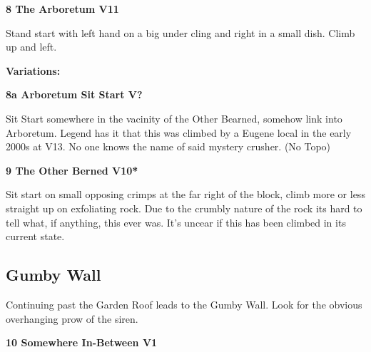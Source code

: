 	\begin{multicols}{2}


\needspace{1.5cm}
\label{rt:The Arboretum}
\colorbox{red!20}{
\parbox{0.95\linewidth}{
\textbf{
8 The Arboretum V11  
}}}

\begin{adjustwidth}{0.5cm}{}			
Stand start with left hand on a big under cling and right in a small dish. Climb up and left.
\end{adjustwidth}

\begin{adjustwidth}{0.5cm}{}				
\needspace{3cm}
\textbf{Variations:} \newline

\needspace{1.5cm}
\label{vr:Arboretum Sit Start}
\colorbox{black!20}{
\parbox{0.95\linewidth}{
\textbf{
8a Arboretum Sit Start V?  
}}}

\begin{adjustwidth}{0.5cm}{}			
Sit Start somewhere in the vacinity of the Other Bearned, somehow link into Arboretum. Legend has it that this was climbed by a Eugene local in the early 2000s at V13. No one knows the name of said mystery crusher. (No Topo)
\end{adjustwidth}


\end{adjustwidth}


\needspace{1.5cm}
\label{rt:The Other Berned}
\colorbox{red!20}{
\parbox{0.95\linewidth}{
\textbf{
9 The Other Berned V10*  
}}}

\begin{adjustwidth}{0.5cm}{}			
Sit start on small opposing crimps at the far right of the block, climb more or less straight up on exfoliating rock. Due to the crumbly nature of the rock its hard to tell what, if anything, this ever was. It's uncear if this has been climbed in its current state.
\end{adjustwidth}




\needspace{1.5cm}
\subsection*{Gumby Wall}\label{bf:Gumby Wall}
Continuing past the Garden Roof leads to the Gumby Wall. Look for the obvious overhanging prow of the siren.\\
	


\needspace{1.5cm}
\label{rt:Somewhere In-Between}
\colorbox{green!20}{
\parbox{0.95\linewidth}{
\textbf{
10 Somewhere In-Between V1  
}}}


\end{multicols}
